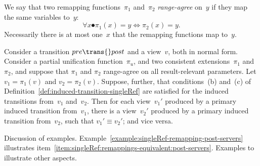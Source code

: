 We say that two remapping functions~$\pi_1$ and~$\pi_2$ \emph{range-agree}
on~$y$ if they map the same variables to~$y$:
\[
\forall x \spot \pi_1(x) = y \iff \pi_2(x) = y.
\]
Necessarily there is at most one~$x$ that the remapping functions map to~$y$.

\begin{lemma}
\label{lem:singleRef:remappings-equivalent-primary}
Consider a transition $pre \trans{} post$ and a view~$v$, both in normal form.
Consider a partial unification function~$\pi_u$, and two consistent
extensions~$\pi_1$ and~$\pi_2$, and suppose that $\pi_1$ and $\pi_2$
range-agree on all result-relevant parameters.  Let $v_1 = \pi_1(v)$ and $v_2
= \pi_2(v)$.  Suppose, further, that conditions~(b) and~(c) of
Definition~\ref{def:induced-transition-singleRef} are satisfied for the
induced transitions from~$v_1$ and~$v_2$.  Then for each view~$v_1'$ produced
by a primary induced transition from~$v_1$, there is a view~$v_2'$ produced by
a primary induced transition from~$v_2$, such that $v_1' \equiv v_2'$; and
vice versa.
\end{lemma}


\framebox{**} Discussion of examples.
Example~\ref{example:singleRef-remapping-post-servers} illustrates
item~\ref{item:singleRef:remappings-equivalent:post-servers}.  Examples to
illustrate other aspects. 


